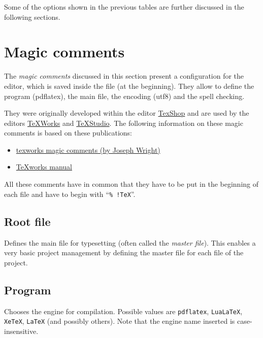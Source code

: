 Some of the options shown in the previous tables are further discussed in the following sections.

\section{Magic comments}
\label{sec:doc:magiccomments}

The \emph{magic comments} discussed in this section present a configuration for the editor, which is saved inside the \latex file (at the beginning). They allow to define the program (pdflatex), the main file, the encoding (utf8) and the spell checking. 

They were originally developed within the editor \href{http://pages.uoregon.edu/koch/texshop/index.html}{TexShop} and are used by the editors \href{http://www.tug.org/texworks/}{TeXWorks} and \href{http://texstudio.sourceforge.net/}{TeXStudio}.
%
The following information on these magic comments is based on these publications:
%
\begin{itemize}
\item \href{http://www.texdev.net/2011/03/24/texworks-magic-comments/} %
      {texworks magic comments (by Joseph Wright)}
\item \href{http://ftp.ctex.org/pub/tex/tools/editors/TeXworks/manual.pdf}%
      {TeXworks manual}
\end{itemize}
%
All these comments have in common that they have to be put in the beginning of each file and have to begin with \enquote{\texttt{\% !TeX}}. 

\subsection{Root file}
\begin{latexcode}
\end{latexcode}
%
Defines the main file for typesetting (often called the \emph{master file}). This enables a very basic project management by defining the master file for each file of the project.

\subsection{Program}
\begin{latexcode}
\end{latexcode}
%
Chooses the engine for compilation. Possible values are \texttt{pdflatex}, \texttt{LuaLaTeX}, \texttt{XeTeX}, \texttt{LaTeX} (and possibly others). Note that the engine name inserted is case-insensitive.

